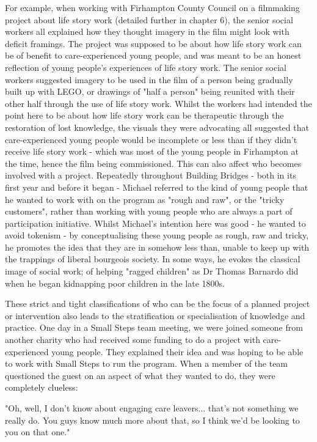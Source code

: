 For example, when working with Firhampton County Council on a filmmaking project about life story work (detailed further in chapter 6), the senior social workers all explained how they thought imagery in the film might look with deficit framings. The project was supposed to be about how life story work can be of benefit to care-experienced young people, and was meant to be an honest reflection of young people's experiences of life story work. The senior social workers suggested imagery to be used in the film of a person being gradually built up with LEGO, or drawings of "half a person" being reunited with their other half through the use of life story work. Whilst the workers had intended the point here to be about how life story work can be therapeutic through the restoration of lost knowledge, the visuals they were advocating all suggested that care-experienced young people would be incomplete or less than if they didn't receive life story work - which was most of the young people in Firhampton at the time, hence the film being commissioned. This can also affect who becomes involved with a project. Repeatedly throughout Building Bridges - both in its first year and before it began - Michael referred to the kind of young people that he wanted to work with on the program as "rough and raw", or the "tricky customers", rather than working with young people who are always a part of participation initiative. Whilst Michael's intention here was good - he wanted to avoid tokenism - by conceptualising these young people as rough, raw and tricky, he promotes the idea that they are in somehow less than, unable to keep up with the trappings of liberal bourgeois society. In some ways, he evokes the classical image of social work; of helping "ragged children" as Dr Thomas Barnardo did when he began kidnapping poor children in the late 1800s.

These strict and tight classifications of who can be the focus of a planned project or intervention also leads to the stratification or specialisation of knowledge and practice. One day in a Small Steps team meeting, we were joined someone from another charity who had received some funding to do a project with care-experienced young people. They explained their idea and was hoping to be able to work with Small Steps to run the program. When a member of the team questioned the guest on an aspect of what they wanted to do, they were completely clueless:

"Oh, well, I don't know about engaging care leavers... that's not something we really do. You guys know much more about that, so I think we'd be looking to you on that one."

